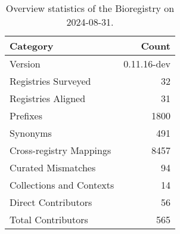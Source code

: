 \begin{table}
\caption{Overview statistics of the Bioregistry on 2024-08-31.}
\label{tab:bioregistry-summary}
\begin{tabular}{lr}
\toprule
Category & Count \\
\midrule
Version & 0.11.16-dev \\
Registries Surveyed & 32 \\
Registries Aligned & 31 \\
Prefixes & 1800 \\
Synonyms & 491 \\
Cross-registry Mappings & 8457 \\
Curated Mismatches & 94 \\
Collections and Contexts & 14 \\
Direct Contributors & 56 \\
Total Contributors & 565 \\
\bottomrule
\end{tabular}
\end{table}
